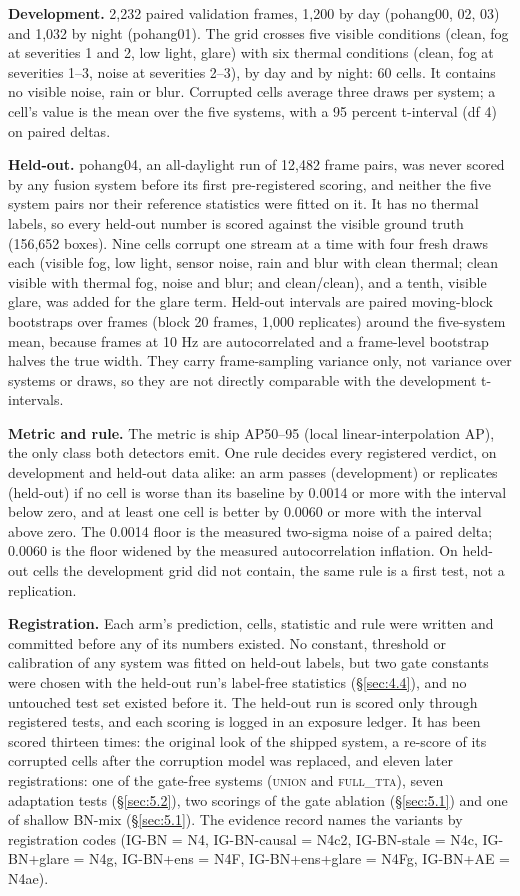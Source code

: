 \documentclass[10pt]{article}
\begin{document}
\textbf{Development.} 2,232 paired validation frames, 1,200 by day (pohang00, 02, 03) and 1,032 by night (pohang01). The grid crosses five visible conditions (clean, fog at severities 1 and 2, low light, glare) with six thermal conditions (clean, fog at severities 1--3, noise at severities 2--3), by day and by night: 60 cells. It contains no visible noise, rain or blur. Corrupted cells average three draws per system; a cell's value is the mean over the five systems, with a 95 percent t-interval (df 4) on paired deltas.

\textbf{Held-out.} pohang04, an all-daylight run of 12,482 frame pairs, was never scored by any fusion system before its first pre-registered scoring, and neither the five system pairs nor their reference statistics were fitted on it. It has no thermal labels, so every held-out number is scored against the visible ground truth (156,652 boxes). Nine cells corrupt one stream at a time with four fresh draws each (visible fog, low light, sensor noise, rain and blur with clean thermal; clean visible with thermal fog, noise and blur; and clean/clean), and a tenth, visible glare, was added for the glare term. Held-out intervals are paired moving-block bootstraps over frames (block 20 frames, 1,000 replicates) around the five-system mean, because frames at 10 Hz are autocorrelated and a frame-level bootstrap halves the true width. They carry frame-sampling variance only, not variance over systems or draws, so they are not directly comparable with the development t-intervals.

\textbf{Metric and rule.} The metric is ship AP50--95 (local linear-interpolation AP), the only class both detectors emit. One rule decides every registered verdict, on development and held-out data alike: an arm passes (development) or replicates (held-out) if no cell is worse than its baseline by 0.0014 or more with the interval below zero, and at least one cell is better by 0.0060 or more with the interval above zero. The 0.0014 floor is the measured two-sigma noise of a paired delta; 0.0060 is the floor widened by the measured autocorrelation inflation. On held-out cells the development grid did not contain, the same rule is a first test, not a replication.

\textbf{Registration.} Each arm's prediction, cells, statistic and rule were written and committed before any of its numbers existed. No constant, threshold or calibration of any system was fitted on held-out labels, but two gate constants were chosen with the held-out run's label-free statistics (\S\ref{sec:4.4}), and no untouched test set existed before it. The held-out run is scored only through registered tests, and each scoring is logged in an exposure ledger. It has been scored thirteen times: the original look of the shipped system, a re-score of its corrupted cells after the corruption model was replaced, and eleven later registrations: one of the gate-free systems (\textsc{union} and \textsc{full\_tta}), seven adaptation tests (\S\ref{sec:5.2}), two scorings of the gate ablation (\S\ref{sec:5.1}) and one of shallow BN-mix (\S\ref{sec:5.1}). The evidence record names the variants by registration codes (IG-BN = N4, IG-BN-causal = N4c2, IG-BN-stale = N4c, IG-BN+glare = N4g, IG-BN+ens = N4F, IG-BN+ens+glare = N4Fg, IG-BN+AE = N4ae).
\end{document}
